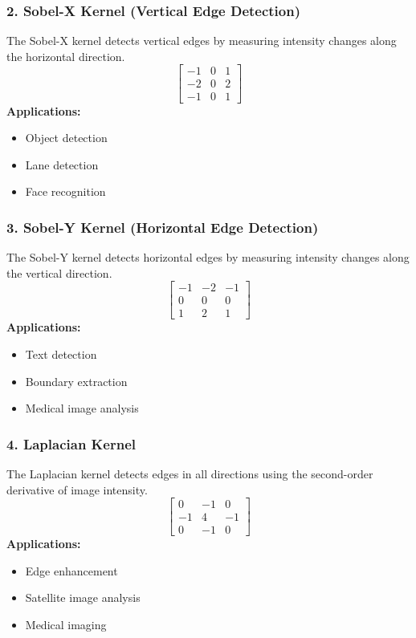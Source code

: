 \documentclass[11pt]{article}
\begin{document}
\subsubsection*{2. Sobel-X Kernel (Vertical Edge Detection)}
The Sobel-X kernel detects vertical edges by measuring intensity changes along the horizontal direction.
\[
\begin{bmatrix}
-1 & 0 & 1 \\
-2 & 0 & 2 \\
-1 & 0 & 1
\end{bmatrix}
\]
\textbf{Applications:}
\begin{itemize}
    \item Object detection
    \item Lane detection
    \item Face recognition
\end{itemize}

\subsubsection*{3. Sobel-Y Kernel (Horizontal Edge Detection)}
The Sobel-Y kernel detects horizontal edges by measuring intensity changes along the vertical direction.
\[
\begin{bmatrix}
-1 & -2 & -1 \\
0 & 0 & 0 \\
1 & 2 & 1
\end{bmatrix}
\]
\textbf{Applications:}
\begin{itemize}
    \item Text detection
    \item Boundary extraction
    \item Medical image analysis
\end{itemize}

\subsubsection*{4. Laplacian Kernel}
The Laplacian kernel detects edges in all directions using the second-order derivative of image intensity.
\[
\begin{bmatrix}
0 & -1 & 0 \\
-1 & 4 & -1 \\
0 & -1 & 0
\end{bmatrix}
\]
\textbf{Applications:}
\begin{itemize}
    \item Edge enhancement
    \item Satellite image analysis
    \item Medical imaging
\end{itemize}
\end{document}
